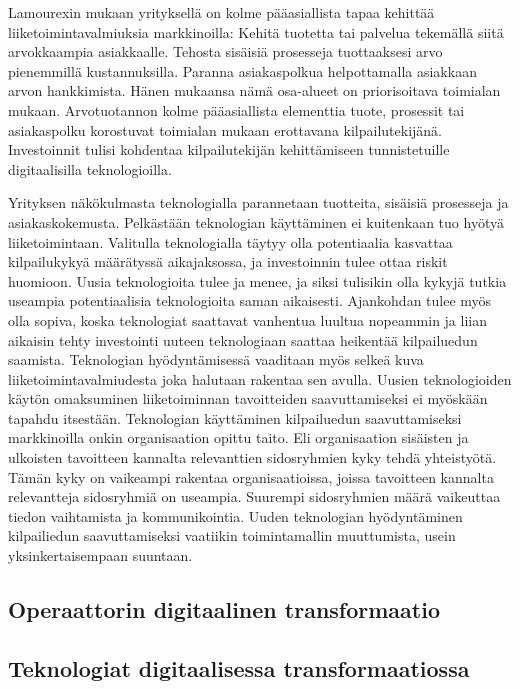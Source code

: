 \documentclass[finnish,12pt,a4paper,pdftex]{article}
\begin{document}
Lamourexin \citeyear{lamoureux} mukaan yrityksellä on kolme pääasiallista tapaa kehittää liiketoimintavalmiuksia markkinoilla: Kehitä tuotetta tai palvelua tekemällä siitä arvokkaampia asiakkaalle. Tehosta sisäisiä prosesseja tuottaaksesi arvo pienemmillä kustannuksilla. Paranna asiakaspolkua helpottamalla asiakkaan arvon hankkimista. Hänen mukaansa nämä osa-alueet on priorisoitava toimialan mukaan. Arvotuotannon kolme pääasiallista elementtia tuote, prosessit tai asiakaspolku korostuvat toimialan mukaan erottavana kilpailutekijänä. Investoinnit tulisi kohdentaa kilpailutekijän kehittämiseen tunnistetuille digitaalisilla teknologioilla.

Yrityksen näkökulmasta teknologialla parannetaan tuotteita, sisäisiä prosesseja ja asiakaskokemusta. Pelkästään teknologian käyttäminen ei kuitenkaan tuo hyötyä liiketoimintaan. Valitulla teknologialla täytyy olla potentiaalia kasvattaa kilpailukykyä määrätyssä aikajaksossa, ja investoinnin tulee ottaa riskit huomioon. Uusia teknologioita tulee ja menee, ja siksi tulisikin olla kykyjä tutkia useampia potentiaalisia teknologioita saman aikaisesti. Ajankohdan tulee myös olla sopiva, koska teknologiat saattavat vanhentua luultua nopeammin ja liian aikaisin tehty investointi uuteen teknologiaan saattaa heikentää kilpailuedun saamista. Teknologian hyödyntämisessä vaaditaan myös selkeä kuva liiketoimintavalmiudesta joka halutaan rakentaa sen avulla. Uusien teknologioiden käytön omaksuminen liiketoiminnan tavoitteiden saavuttamiseksi ei myöskään tapahdu itsestään. Teknologian käyttäminen kilpailuedun saavuttamiseksi markkinoilla onkin organisaation opittu taito. Eli organisaation sisäisten ja ulkoisten tavoitteen kannalta relevanttien sidosryhmien kyky tehdä yhteistyötä. Tämän kyky on vaikeampi rakentaa organisaatioissa, joissa tavoitteen kannalta relevantteja sidosryhmiä on useampia. Suurempi sidosryhmien määrä vaikeuttaa tiedon vaihtamista ja kommunikointia. Uuden teknologian hyödyntäminen kilpailiedun saavuttamiseksi vaatiikin toimintamallin muuttumista, usein yksinkertaisempaan suuntaan.

\subsection{Operaattorin digitaalinen transformaatio}

\subsection{Teknologiat digitaalisessa transformaatiossa}
\end{document}
